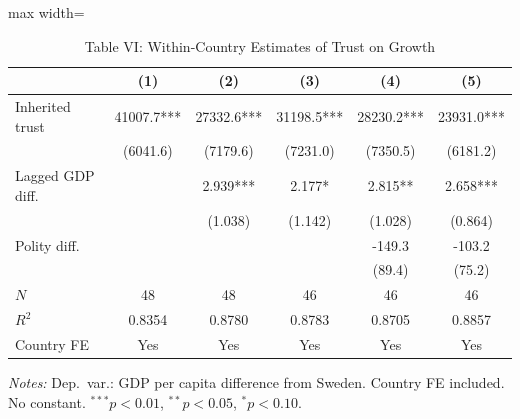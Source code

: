 \begin{table}[htbp]
\centering
\caption{Table VI: Within-Country Estimates of Trust on Growth}
\label{tab:algan_table6}
\begin{adjustbox}{max width=\textwidth}
\begin{tabular}{lccccc}
\toprule
 & (1) & (2) & (3) & (4) & (5) \\
\midrule
Inherited trust & 41007.7*** & 27332.6*** & 31198.5*** & 28230.2*** & 23931.0*** \\
 & (6041.6) & (7179.6) & (7231.0) & (7350.5) & (6181.2) \\
Lagged GDP diff. &  & 2.939*** & 2.177* & 2.815** & 2.658*** \\
 &  & (1.038) & (1.142) & (1.028) & (0.864) \\
Polity diff. &  &  &  & -149.3 & -103.2 \\
 &  &  &  & (89.4) & (75.2) \\
\midrule
$N$ & 48 & 48 & 46 & 46 & 46 \\
$R^2$ & 0.8354 & 0.8780 & 0.8783 & 0.8705 & 0.8857 \\
\midrule
Country FE & Yes & Yes & Yes & Yes & Yes \\
\bottomrule
\end{tabular}
\end{adjustbox}
\parbox{\textwidth}{\footnotesize\textit{Notes:} Dep.\ var.: GDP per capita difference from Sweden. Country FE included. No constant. $^{***}p<0.01$, $^{**}p<0.05$, $^{*}p<0.10$.}
\end{table}